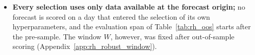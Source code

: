 \begin{itemize}
\item \textbf{Every selection uses only data available at the forecast origin;} no forecast is scored on a day that
  entered the selection of its own hyperparameters, and the evaluation span of Table~\ref{tab:rh_oos} starts after
  the pre-sample. The window $W$, however, was fixed after out-of-sample scoring
  (Appendix~\ref{app:rh_robust_window}).
\end{itemize}

